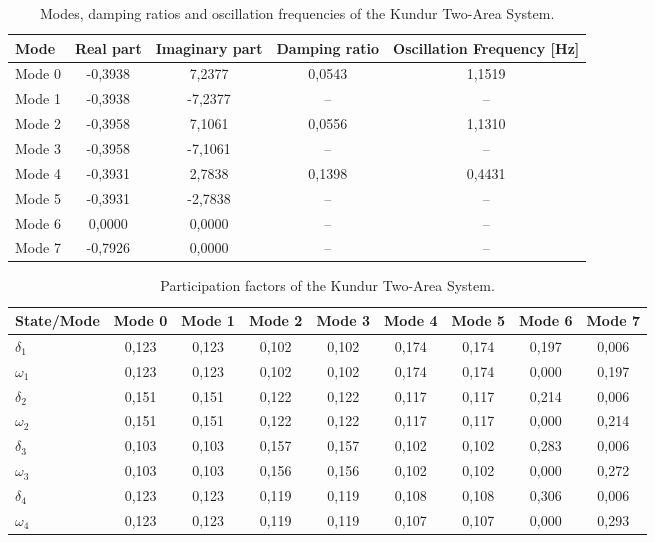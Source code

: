 \begin{table}[H]
\centering
\caption{Modes, damping ratios and oscillation frequencies of the Kundur Two-Area System.}
\label{tab:eigenvalues_kundur}
\renewcommand{\arraystretch}{1.2}
\small
\begin{tabular}{lcccc}
\hline
\textbf{Mode} & \textbf{Real part} & \textbf{Imaginary part} & \textbf{Damping ratio} & \textbf{Oscillation Frequency [Hz]} \\ 
\hline
Mode 0 & -0,3938 & 7,2377 & 0,0543 & 1,1519 \\
Mode 1 & -0,3938 & -7,2377 & -- & -- \\
Mode 2 & -0,3958 & 7,1061 & 0,0556 & 1,1310 \\
Mode 3 & -0,3958 & -7,1061 & -- & -- \\
Mode 4 & -0,3931 & 2,7838 & 0,1398 & 0,4431 \\
Mode 5 & -0,3931 & -2,7838 & -- & -- \\
Mode 6 & 0,0000  & 0,0000  & -- & -- \\
Mode 7 & -0,7926 & 0,0000  & -- & -- \\
\hline
\end{tabular}
\end{table}


\begin{table}[H]
\centering
\caption{Participation factors of the Kundur Two-Area System.}
\label{tab:pfactors_kundur}
\renewcommand{\arraystretch}{1.2}
\small
\begin{tabular}{lcccccccc}
\hline
\textbf{State/Mode} & \textbf{Mode 0} & \textbf{Mode 1} & \textbf{Mode 2} & \textbf{Mode 3} & \textbf{Mode 4} & \textbf{Mode 5} & \textbf{Mode 6} & \textbf{Mode 7} \\ 
\hline
$\delta_1$ & 0,123 & 0,123 & 0,102 & 0,102 & 0,174 & 0,174 & 0,197 & 0,006 \\
$\omega_1$ & 0,123 & 0,123 & 0,102 & 0,102 & 0,174 & 0,174 & 0,000 & 0,197 \\
$\delta_2$ & 0,151 & 0,151 & 0,122 & 0,122 & 0,117 & 0,117 & 0,214 & 0,006 \\
$\omega_2$ & 0,151 & 0,151 & 0,122 & 0,122 & 0,117 & 0,117 & 0,000 & 0,214 \\
$\delta_3$ & 0,103 & 0,103 & 0,157 & 0,157 & 0,102 & 0,102 & 0,283 & 0,006 \\
$\omega_3$ & 0,103 & 0,103 & 0,156 & 0,156 & 0,102 & 0,102 & 0,000 & 0,272 \\
$\delta_4$ & 0,123 & 0,123 & 0,119 & 0,119 & 0,108 & 0,108 & 0,306 & 0,006 \\
$\omega_4$ & 0,123 & 0,123 & 0,119 & 0,119 & 0,107 & 0,107 & 0,000 & 0,293 \\
\hline
\end{tabular}
\end{table}


